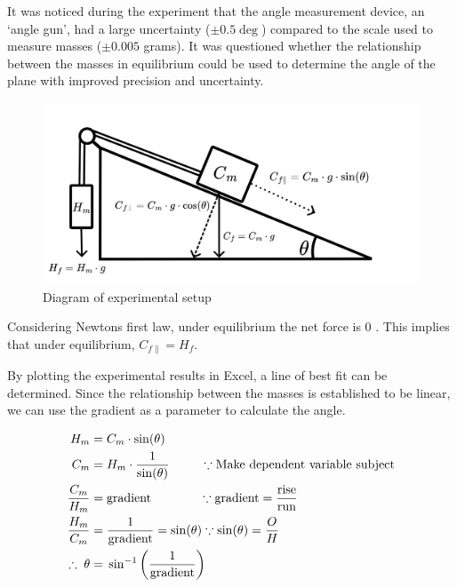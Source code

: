 \documentclass[11pt,a4paper]{article}
\begin{document}
It was noticed during the experiment that the angle measurement device, an `angle gun', had a large uncertainty ($\pm0.5\deg$) compared to the scale used to measure masses ($\pm0.005$ grams). It was questioned whether the relationship between the masses in equilibrium could be used to determine the angle of the plane with improved precision and uncertainty. 
\newline
\begin{figure}[h]
	\centering
	\includegraphics[width=0.5\paperwidth]{./Diagrams/set_upV2.png}
	\caption{Diagram of experimental setup}
\end{figure}
\newline
Considering Newtons first law, under equilibrium the net force is 0 \cite{encyclopediabritannica_2023_newtons}. This implies that under equilibrium,  $C_{f\parallel}=H_f$.

By plotting the experimental results in Excel, a line of best fit can be determined. Since the relationship between the masses is established to be linear, we can use the gradient as a parameter to calculate the angle. 

\begin{center}
	\begin{align*}
	H_m= &\;C_m\cdot{\sin(\theta)} \\
	C_m= &\;H_m\cdot\frac{1}{{\sin(\theta)}}\;\;\;\; \;\;\;\;\;\because \textrm{Make dependent variable subject} \\
	\frac{C_m}{H_m}=&\;\textrm{gradient}	\;\;\;\;\;\;\;\;\;\;\;\;\;\;\because \textrm{gradient}=\frac{\textrm{rise}}{\textrm{run}}\\
\linebreak
	\frac{H_m}{C_m}=&\;\frac{1}{\mathrm{gradient}}=\sin(\theta) \because \sin(\theta)=\frac{O}{H}\\
	\therefore  \;\theta=&\;\sin^{-1}\left(\frac{1}{\textrm{gradient}}\right)
	\end{align*}
\end{center}
\end{document}
